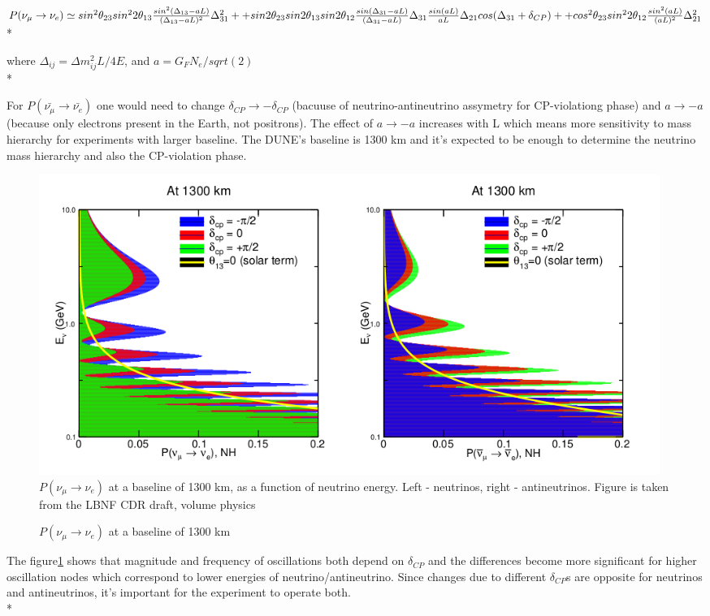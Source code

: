 $P(\nu_\mu \rightarrow \nu_e) \simeq sin^2{\theta_{23}}sin^2{2\theta_{13}}\frac{sin^2(\Delta_{13}-aL)}{(\Delta_{13}-aL)^2}\Delta^2_{31}+ \\*
+sin2\theta_{23}sin2\theta_{13}sin2\theta_{12}\frac{sin(\Delta_{31}-aL)}{(\Delta_{31}-aL)}\Delta_{31}\frac{sin(aL)}{aL}\Delta_{21}cos(\Delta_{31}+\delta_{CP})+ \\*
+cos^2\theta_{23}sin^2{2\theta_{12}}\frac{sin^2(aL)}{(aL)^2}\Delta^2_{21}$\\*

where $\Delta_{ij}={\Delta}m^2_{ij}L/4E$, and $a={G_F}{N_e}/sqrt(2)$\\*

For $P(\bar{\nu_\mu} \rightarrow \bar{\nu_e})$ one would need to change $\delta_{CP} \rightarrow -\delta_{CP}$ (bacuuse of neutrino-antineutrino assymetry for CP-violationg phase) and $a \rightarrow -a$ (because only electrons present in the Earth, not positrons). The effect of $a \rightarrow -a$ increases with L which means more sensitivity to mass hierarchy for experiments with larger baseline. The DUNE's baseline is 1300 km and it's expected to be enough to determine the neutrino mass hierarchy and also the CP-violation phase.

\begin{figure}
\caption{$P(\nu_\mu \rightarrow \nu_e)$ at a baseline of 1300 km}
\label{fig:LBNF_oscProbability}
\centering
\includegraphics[width=0.98\textwidth, keepaspectratio=true]{figs/LBNF_oscProbability.png}
\\$P(\nu_\mu \rightarrow \nu_e)$ at a baseline of 1300 km, as a function of neutrino energy. Left - neutrinos, right - antineutrinos. Figure is taken from the LBNF CDR draft, volume physics\cite{ref_LBNFdoc_volume-physics}
\end{figure}

The figure\ref{fig:LBNF_oscProbability} shows that magnitude and frequency of oscillations both depend on $\delta_{CP}$ and the differences become more significant for higher oscillation nodes which correspond to lower energies of neutrino/antineutrino. Since changes due to different $\delta_{CP}$s are opposite for neutrinos and antineutrinos, it's important for the experiment to operate both.\\*

